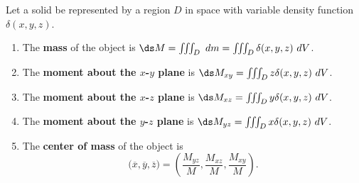 {Let a solid be represented by a region $D$ in space with variable density function $\delta(x,y,z)$. 
\begin{enumerate}
	\item The \textbf{mass} of the object is $\ds M= \iiint_D \ dm=\iiint_D \delta(x,y,z)\ dV$.
	\item	The \textbf{moment about the $x$-$y$ plane} is $\ds M_{xy}=\iiint_D z\delta(x,y,z)\ dV$.
	\item	The \textbf{moment about the $x$-$z$ plane} is $\ds M_{xz}=\iiint_D y\delta(x,y,z)\ dV$.
	\item	The \textbf{moment about the $y$-$z$ plane} is $\ds M_{yz}=\iiint_D x\delta(x,y,z)\ dV$.
	\item The \textbf{center of mass} of the object is
	\[\big(\overline{x},\overline{y},\overline{z}\big) = \left(\frac{M_{yz}}M,\frac{M_{xz}}M,\frac{M_{xy}}M\right).\]
\end{enumerate}
}

